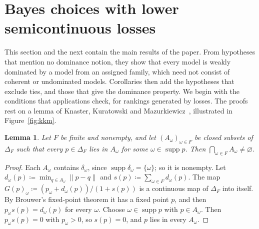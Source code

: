 \documentclass[11pt]{article}
\newtheorem{lemma}[theorem]{Lemma}
\theoremstyle{definition}
\theoremstyle{remark}
\newcommand{\supp}{\operatorname{supp}}
\begin{document}
\begin{enumerate}[label=(\arabic*),leftmargin=*]
\end{enumerate}

\section{Bayes choices with lower semicontinuous losses}\label{sec:bayes}

This section and the next contain the main results of the paper. From hypotheses that mention no dominance notion, they show that every model is weakly dominated by a model from an assigned family, which need not consist of coherent or undominated models. Corollaries then add the hypotheses that exclude ties, and those that give the dominance property. We begin with the conditions that applications check, for rankings generated by losses. The proofs rest on a lemma of Knaster, Kuratowski and Mazurkiewicz~\cite{KKM}, illustrated in Figure~\ref{fig:kkm}.

\begin{lemma}\label{lem:kkm}
Let $F$ be finite and nonempty, and let $(A_\omega)_{\omega\in F}$ be closed subsets of $\Delta_F$ such that every $p\in\Delta_F$ lies in $A_\omega$ for some $\omega\in\supp p$. Then $\bigcap_{\omega\in F}A_\omega\ne\varnothing$.
\end{lemma}
\begin{proof}
Each $A_\omega$ contains $\delta_\omega$, since $\supp\delta_\omega=\{\omega\}$; so it is nonempty. Let $d_\omega(p)\coloneqq\min_{q\in A_\omega}\lVert p-q\rVert$ and $s(p)\coloneqq\sum_{\omega\in F}d_\omega(p)$. The map $G(p)_\omega\coloneqq(p_\omega+d_\omega(p))/(1+s(p))$ is a continuous map of $\Delta_F$ into itself. By Brouwer's fixed-point theorem it has a fixed point $p$, and then $p_\omega s(p)=d_\omega(p)$ for every $\omega$. Choose $\omega\in\supp p$ with $p\in A_\omega$. Then $p_\omega s(p)=0$ with $p_\omega>0$, so $s(p)=0$, and $p$ lies in every $A_\omega$.
\end{proof}
\end{document}
